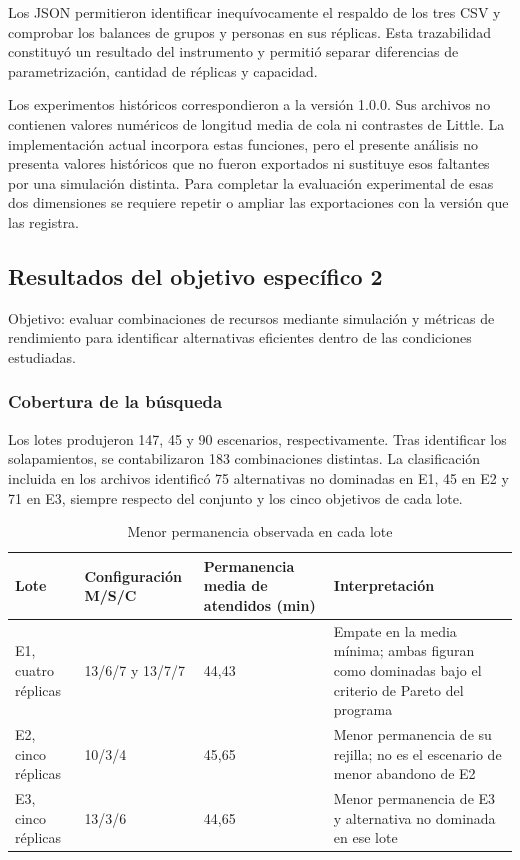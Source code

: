 \documentclass[10pt,a4paper,twocolumn]{article}
\begin{document}
Los JSON permitieron identificar inequívocamente el respaldo de los tres CSV y comprobar los balances de grupos y personas en sus réplicas. Esta trazabilidad constituyó un resultado del instrumento y permitió separar diferencias de parametrización, cantidad de réplicas y capacidad.

Los experimentos históricos correspondieron a la versión 1.0.0. Sus archivos no contienen valores numéricos de longitud media de cola ni contrastes de Little. La implementación actual incorpora estas funciones, pero el presente análisis no presenta valores históricos que no fueron exportados ni sustituye esos faltantes por una simulación distinta. Para completar la evaluación experimental de esas dos dimensiones se requiere repetir o ampliar las exportaciones con la versión que las registra.

\subsection{Resultados del objetivo específico 2}

Objetivo: evaluar combinaciones de recursos mediante simulación y métricas de rendimiento para identificar alternativas eficientes dentro de las condiciones estudiadas.

\subsubsection*{Cobertura de la búsqueda}

Los lotes produjeron 147, 45 y 90 escenarios, respectivamente. Tras identificar los solapamientos, se contabilizaron 183 combinaciones distintas. La clasificación incluida en los archivos identificó 75 alternativas no dominadas en E1, 45 en E2 y 71 en E3, siempre respecto del conjunto y los cinco objetivos de cada lote.

\begin{table}[!tb]\centering\small
\caption{Menor permanencia observada en cada lote}
\label{tab:6}
\setlength{\tabcolsep}{4pt}
\renewcommand{\arraystretch}{1.18}
\begin{tabularx}{\textwidth}{YYYY}
\toprule
\textbf{Lote} & \textbf{Configuración M/S/C} & \textbf{Permanencia media de atendidos (min)} & \textbf{Interpretación} \\
\midrule
E1, cuatro réplicas & 13/6/7 y 13/7/7 & 44,43 & Empate en la media mínima; ambas figuran como dominadas bajo el criterio de Pareto del programa \\
E2, cinco réplicas & 10/3/4 & 45,65 & Menor permanencia de su rejilla; no es el escenario de menor abandono de E2 \\
E3, cinco réplicas & 13/3/6 & 44,65 & Menor permanencia de E3 y alternativa no dominada en ese lote \\
\bottomrule\end{tabularx}\end{table}
\end{document}
